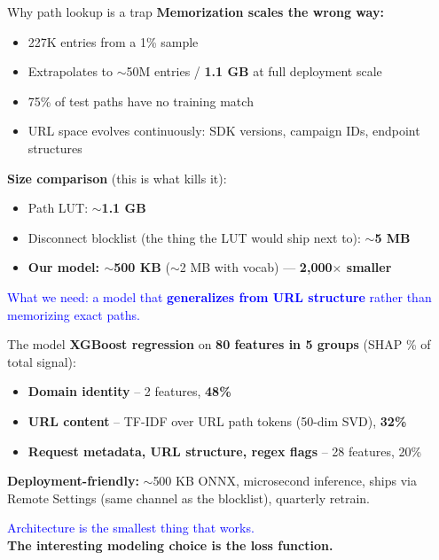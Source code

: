 \documentclass[10pt,aspectratio=169]{beamer}
\begin{document}
\begin{frame}{Why path lookup is a trap}
    \textbf{Memorization scales the wrong way:}
    \begin{itemize}
        \item 227K entries from a 1\% sample
        \item Extrapolates to $\sim$50M entries / \textbf{1.1 GB} at full deployment scale
        \item 75\% of test paths have no training match
        \item URL space evolves continuously: SDK versions, campaign IDs, endpoint structures
    \end{itemize}

    \vspace{0.7em}
    \textbf{Size comparison} (this is what kills it):
    \begin{itemize}
        \item Path LUT: \textbf{$\sim$1.1 GB}
        \item Disconnect blocklist (the thing the LUT would ship next to): \textbf{$\sim$5 MB}
        \item \textbf{Our model: $\sim$500 KB} ($\sim$2 MB with vocab) — \textbf{2{,}000$\times$ smaller}
    \end{itemize}

    \vspace{0.4em}
    \textcolor{blue}{What we need: a model that \textbf{generalizes from URL structure} rather than memorizing exact paths.}
\end{frame}

\begin{frame}{The model}
    \textbf{XGBoost regression} on \textbf{80 features in 5 groups} (SHAP \% of total signal):
    \begin{itemize}
        \item \textbf{Domain identity} -- 2 features, \textbf{48\%}
        \item \textbf{URL content} -- TF-IDF over URL path tokens (50-dim SVD), \textbf{32\%}
        \item \textbf{Request metadata, URL structure, regex flags} -- 28 features, 20\%
    \end{itemize}

    \vspace{0.5em}
    \textbf{Deployment-friendly:} $\sim$500 KB ONNX, microsecond inference, ships via Remote Settings (same channel as the blocklist), quarterly retrain.

    \vspace{0.7em}
    \textcolor{blue}{Architecture is the smallest thing that works.} \\
    \textbf{The interesting modeling choice is the loss function.}
\end{frame}
\end{document}

